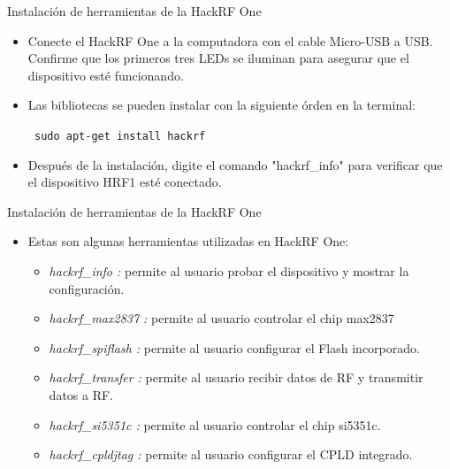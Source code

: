 \begin{frame}{Instalación de  herramientas de la HackRF One}

\begin{itemize}
    \item
    {Conecte el HackRF One a la computadora con el cable Micro-USB a USB. Confirme que los primeros tres  LEDs se iluminan para asegurar que el dispositivo esté funcionando.}
    \item
    {Las bibliotecas se pueden instalar con la siguiente órden en la terminal:
    
    \begin{block}{}
    \texttt{
    sudo apt-get install hackrf}
    \end{block}
    }
    \item
    {Después de la instalación, digite el comando "hackrf\_info" para verificar que el dispositivo HRF1 esté conectado.}
    
\end{itemize}
\end{frame}

\begin{frame}{Instalación de  herramientas de la HackRF One}

\begin{itemize}
    \item
    {Estas son algunas herramientas utilizadas en HackRF One:
    \begin{itemize}
        \item  {\textit{hackrf\_info :} permite al usuario probar el dispositivo y mostrar la configuración.}
        \item  {\textit{hackrf\_max2837 :} permite al usuario controlar el chip max2837}
        \item  {\textit{hackrf\_spiflash :} permite al usuario configurar el Flash incorporado.}
        \item  {\textit{hackrf\_transfer :} permite al usuario recibir datos de RF y transmitir datos a RF.}
        \item  {\textit{hackrf\_si5351c :} permite al usuario controlar el chip si5351c.}
        \item  {\textit{hackrf\_cpldjtag :} permite al usuario configurar el CPLD integrado.}
    \end{itemize}
    }
\end{itemize}
\end{frame}

